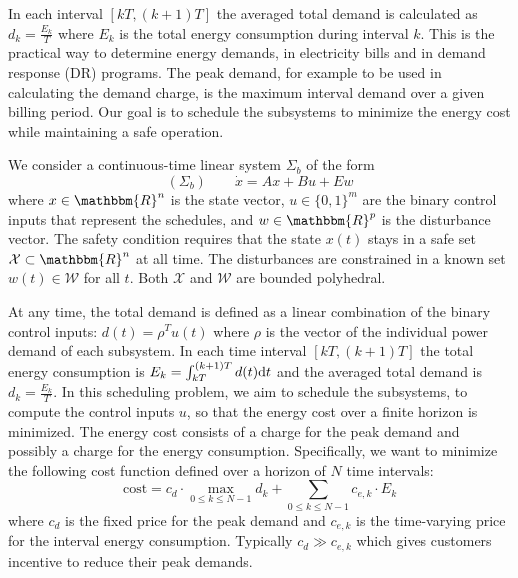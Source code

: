 In each interval $[kT, (k + 1) T]$ the averaged total demand is calculated as $d_k = \frac{E_k}{T}$ where $E_k$ is the total energy consumption during interval $k$.
This is the practical way to determine energy demands, \eg in electricity bills and in demand response (DR) programs.
The peak demand, for example to be used in calculating the demand charge, is the maximum interval demand over a given billing period. %
Our goal is to schedule the subsystems to minimize the energy cost %
while maintaining a safe operation.

We consider a continuous-time linear system $\Sigma_b$ of the form
%
\begin{equation*}
(\Sigma_b) \qquad \dot{x} = Ax + Bu + Ew
\end{equation*}
%
where $x \in \mathbbm{R}^{n}$ is the state vector, $u \in \{ 0, 1 \}^{m}$ are the binary control inputs that represent the schedules, and $w \in \mathbbm{R}^{p}$ is the disturbance vector.
The safety condition requires that the state $x (t)$ stays in a safe set $\mathcal{X} \subset \mathbbm{R}^n$ at all time.
The disturbances are constrained in a known set $w (t) \in \mathcal{W}$ for all $t$.
Both $\mathcal{X}$ and $\mathcal{W}$ are bounded polyhedral.

At any time, the total demand is defined as a linear combination of the binary
control inputs: $d (t) = \rho^T u (t)$ where $\rho$ is the vector of the individual
power demand of each subsystem. In each time interval $[kT, (k + 1) T]$ the
total energy consumption is $E_k = \int_{kT}^{(k + 1) T} d (t) \mathrm{d} t$ and
the averaged total demand is $d_k = \frac{E_k}{T}$. 
In this scheduling problem, we aim to schedule
the subsystems, \ie to compute the control inputs $u$, so that the energy cost over a finite horizon is minimized.
The energy cost consists of a charge for the peak demand and possibly a charge for the energy
consumption.
Specifically, we want to minimize the following cost function defined over a horizon of $N$ time intervals:
\begin{equation}
  \label{eq:cost-function} \text{cost} = c_d \cdot \max_{0 \leqslant k
  \leqslant N - 1} d_k + \textstyle\sum_{0 \leqslant k \leqslant N - 1} c_{e, k} \cdot
  E_k
\end{equation}
where $c_d$ is the fixed price for the peak demand and $c_{e, k}$ is the
time-varying price for the interval energy consumption.
Typically $c_d \gg c_{e, k}$ which gives customers incentive to reduce their peak demands.


